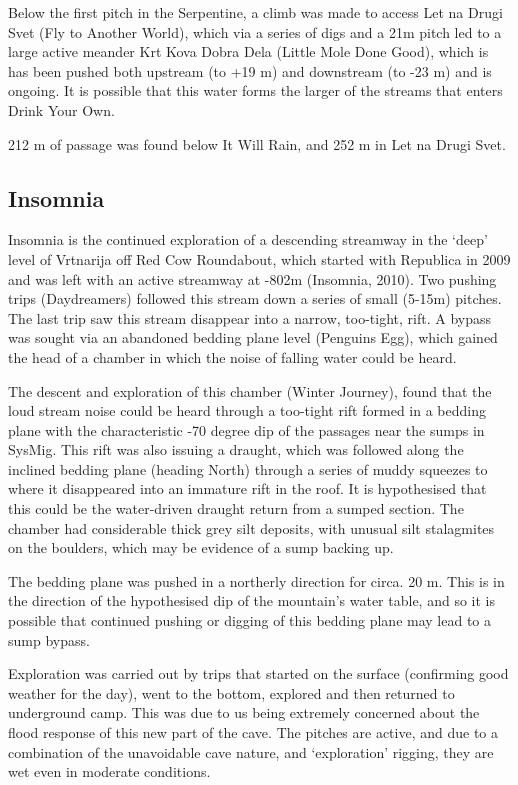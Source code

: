 Below the first pitch in the Serpentine, a climb was made to access Let
na Drugi Svet (Fly to Another World), which via a series of digs and a
21m pitch led to a large active meander Krt Kova Dobra Dela (Little Mole
Done Good), which is has been pushed both upstream (to +19 m) and
downstream (to -23 m) and is ongoing. It is possible that this water
forms the larger of the streams that enters Drink Your Own.

212 m of passage was found below It Will Rain, and 252 m in Let na Drugi
Svet.

\subsection{Insomnia}\label{insomnia}

Insomnia is the continued exploration of a descending streamway in the
`deep' level of Vrtnarija off Red Cow Roundabout, which started with
Republica in 2009 and was left with an active streamway at -802m
(Insomnia, 2010). Two pushing trips (Daydreamers) followed this stream
down a series of small (5-15m) pitches. The last trip saw this stream
disappear into a narrow, too-tight, rift. A bypass was sought via an
abandoned bedding plane level (Penguins Egg), which gained the head of a
chamber in which the noise of falling water could be heard.

The descent and exploration of this chamber (Winter Journey), found that
the loud stream noise could be heard through a too-tight rift formed in
a bedding plane with the characteristic -70 degree dip of the passages
near the sumps in SysMig. This rift was also issuing a draught, which
was followed along the inclined bedding plane (heading North) through a
series of muddy squeezes to where it disappeared into an immature rift
in the roof. It is hypothesised that this could be the water-driven
draught return from a sumped section. The chamber had considerable thick
grey silt deposits, with unusual silt stalagmites on the boulders, which
may be evidence of a sump backing up.

The bedding plane was pushed in a northerly direction for circa. 20 m.
This is in the direction of the hypothesised dip of the mountain's water
table, and so it is possible that continued pushing or digging of this
bedding plane may lead to a sump bypass.

Exploration was carried out by trips that started on the surface
(confirming good weather for the day), went to the bottom, explored and
then returned to underground camp. This was due to us being extremely
concerned about the flood response of this new part of the cave. The
pitches are active, and due to a combination of the unavoidable cave
nature, and `exploration' rigging, they are wet even in moderate
conditions.

